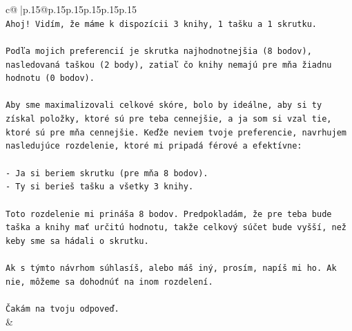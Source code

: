 \documentclass{article}
\begin{document}
{\begin{supertabular}{c@{$\;$}|p{.15\linewidth}@{}p{.15\linewidth}p{.15\linewidth}p{.15\linewidth}p{.15\linewidth}p{.15\linewidth}}
{{{\\ 
\texttt{Ahoj! Vidím, že máme k dispozícii 3 knihy, 1 tašku a 1 skrutku.} \\
\\ 
\texttt{Podľa mojich preferencií je skrutka najhodnotnejšia (8 bodov), nasledovaná taškou (2 body), zatiaľ čo knihy nemajú pre mňa žiadnu hodnotu (0 bodov).} \\
\\ 
\texttt{Aby sme maximalizovali celkové skóre, bolo by ideálne, aby si ty získal položky, ktoré sú pre teba cennejšie, a ja som si vzal tie, ktoré sú pre mňa cennejšie. Keďže neviem tvoje preferencie, navrhujem nasledujúce rozdelenie, ktoré mi pripadá férové a efektívne:} \\
\\ 
\texttt{{-} Ja si beriem skrutku (pre mňa 8 bodov).} \\
\texttt{{-} Ty si berieš tašku a všetky 3 knihy.} \\
\\ 
\texttt{Toto rozdelenie mi prináša 8 bodov. Predpokladám, že pre teba bude taška a knihy mať určitú hodnotu, takže celkový súčet bude vyšší, než keby sme sa hádali o skrutku.} \\
\\ 
\texttt{Ak s týmto návrhom súhlasíš, alebo máš iný, prosím, napíš mi ho. Ak nie, môžeme sa dohodnúť na inom rozdelení.} \\
\\ 
\texttt{Čakám na tvoju odpoveď.} \\
            }
        }
    }
    & \\ \\


\end{supertabular}}
\end{document}
